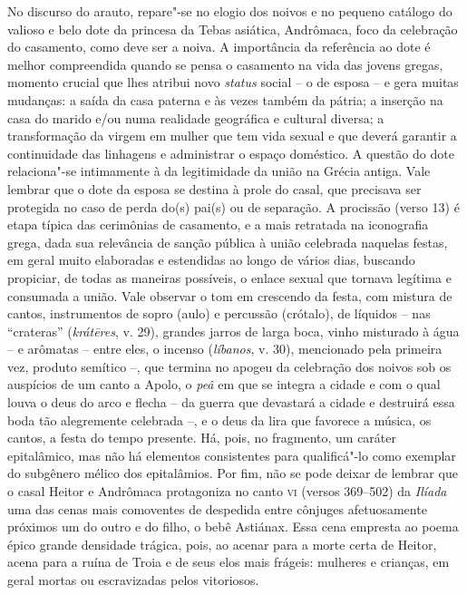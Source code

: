 {No discurso do arauto, repare"-se no
elogio dos noivos e no pequeno catálogo do valioso e belo dote da princesa da
Tebas asiática, Andrômaca, foco da celebração do casamento, como deve ser a noiva.
A importância da
referência ao dote é melhor
compreendida quando se pensa o casamento na vida das jovens gregas, momento
crucial que lhes atribui novo \textit{status} social -- o de esposa -- e gera
muitas mudanças: a saída da casa paterna e às vezes também da pátria; a
inserção na casa do marido e/ou numa realidade geográfica e cultural diversa; a
transformação da virgem em mulher que tem vida sexual e que deverá garantir a
continuidade das linhagens e administrar o espaço doméstico. A questão do dote
relaciona"-se intimamente à da legitimidade da união na Grécia antiga. Vale
lembrar que o dote da esposa se destina à prole do casal, que precisava ser
protegida no caso de perda do(s) pai(s) ou de separação. A procissão (verso
13) é etapa típica das cerimônias de casamento, e a mais retratada na iconografia grega, dada sua relevância de sanção pública à união celebrada naquelas festas, em geral muito elaboradas e
estendidas ao longo de vários dias, buscando propiciar, de todas as maneiras
possíveis, o enlace sexual que tornava legítima e consumada a união.
Vale observar o tom em crescendo da festa, com mistura de cantos, instrumentos de sopro (aulo) e percussão (crótalo), de líquidos -- nas ``crateras'' (\textit{krátēres}, v. 29), grandes jarros de larga boca, vinho misturado à água -- e arômatas  -- entre eles, o incenso (\textit{líbanos}, v. 30), mencionado pela primeira vez, produto semítico --, que termina no apogeu da celebração dos noivos sob os auspícios de um canto a Apolo, o \textit{peâ} em que se integra a cidade e com o qual louva o deus do arco e flecha -- da guerra que devastará a cidade e destruirá essa boda tão alegremente celebrada --, e o deus da lira que favorece a música, os cantos, a festa do tempo presente. 
Há, pois, no fragmento, um caráter epitalâmico, mas não há elementos consistentes para
qualificá"-lo como exemplar do subgênero mélico dos epitalâmios. Por fim, não se
pode deixar de lembrar que o casal Heitor e Andrômaca protagoniza no canto \textsc{vi}
(versos 369--502) da \textit{Ilíada} uma das cenas mais comoventes de despedida
entre cônjuges afetuosamente próximos um do outro e do filho, o bebê Astiánax.
Essa cena empresta ao poema épico grande densidade trágica, pois, ao acenar
para a morte certa de Heitor, acena para a ruína de Troia e de seus elos mais
frágeis: mulheres e crianças, em geral mortas ou escravizadas pelos vitoriosos.
}
